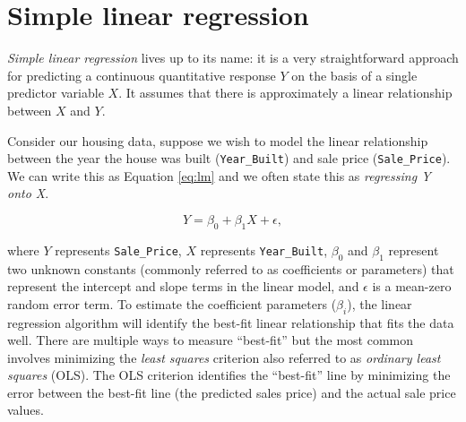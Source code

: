 \documentclass[]{book}
\newenvironment{Shaded}{\begin{snugshade}}{\end{snugshade}}
\newcommand{\CommentTok}[1]{\textcolor[rgb]{0.56,0.35,0.01}{\textit{#1}}}
\newcommand{\DataTypeTok}[1]{\textcolor[rgb]{0.13,0.29,0.53}{#1}}
\newcommand{\DecValTok}[1]{\textcolor[rgb]{0.00,0.00,0.81}{#1}}
\newcommand{\FloatTok}[1]{\textcolor[rgb]{0.00,0.00,0.81}{#1}}
\newcommand{\KeywordTok}[1]{\textcolor[rgb]{0.13,0.29,0.53}{\textbf{#1}}}
\newcommand{\NormalTok}[1]{#1}
\newcommand{\OperatorTok}[1]{\textcolor[rgb]{0.81,0.36,0.00}{\textbf{#1}}}
\newcommand{\StringTok}[1]{\textcolor[rgb]{0.31,0.60,0.02}{#1}}
\theoremstyle{definition}
\theoremstyle{definition}
\theoremstyle{definition}
\theoremstyle{remark}
\begin{document}
\begin{Shaded}
\end{Shaded}

\hypertarget{simple-linear-regression}{%
\section{Simple linear regression}\label{simple-linear-regression}}

\emph{Simple linear regression} lives up to its name: it is a very
straightforward approach for predicting a continuous quantitative
response \(Y\) on the basis of a single predictor variable \(X\). It
assumes that there is approximately a linear relationship between \(X\)
and \(Y\).

Consider our housing data, suppose we wish to model the linear
relationship between the year the house was built (\texttt{Year\_Built})
and sale price (\texttt{Sale\_Price}). We can write this as Equation
\eqref{eq:lm} and we often state this as \emph{regressing Y onto X}.

\begin{equation}
\label{eq:lm}
  Y = \beta_0 + \beta_1X + \epsilon,
\end{equation}

where \(Y\) represents \texttt{Sale\_Price}, \(X\) represents
\texttt{Year\_Built}, \(\beta_0\) and \(\beta_1\) represent two unknown
constants (commonly referred to as coefficients or parameters) that
represent the intercept and slope terms in the linear model, and
\(\epsilon\) is a mean-zero random error term. To estimate the
coefficient parameters (\(\beta_i\)), the linear regression algorithm
will identify the best-fit linear relationship that fits the data well.
There are multiple ways to measure ``best-fit'' but the most common
involves minimizing the \emph{least squares} criterion also referred to
as \emph{ordinary least squares} (OLS). The OLS criterion identifies the
``best-fit'' line by minimizing the error between the best-fit line (the
predicted sales price) and the actual sale price values.
\end{document}
